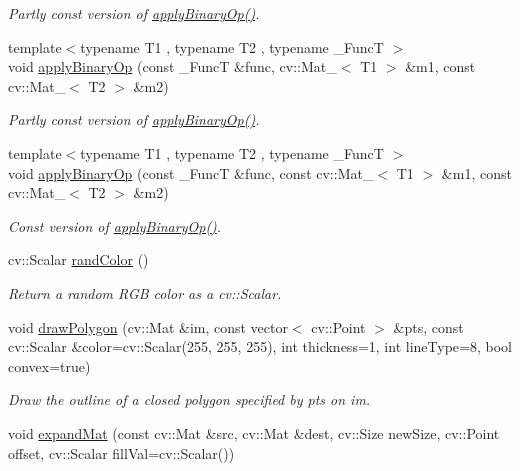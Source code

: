 \begin{DoxyCompactItemize}
\begin{DoxyCompactList}\small\item\em Partly const version of \hyperlink{namespacecvutils_a9a51cd204369adbf1321482a67c101dc}{apply\-Binary\-Op()}. \end{DoxyCompactList}\item 
{\footnotesize template$<$typename T1 , typename T2 , typename \-\_\-\-Func\-T $>$ }\\void \hyperlink{namespacecvutils_a18bf9198d170d4f95ebeda01c4c66b48}{apply\-Binary\-Op} (const \-\_\-\-Func\-T \&func, cv\-::\-Mat\-\_\-$<$ T1 $>$ \&m1, const cv\-::\-Mat\-\_\-$<$ T2 $>$ \&m2)
\begin{DoxyCompactList}\small\item\em Partly const version of \hyperlink{namespacecvutils_a9a51cd204369adbf1321482a67c101dc}{apply\-Binary\-Op()}. \end{DoxyCompactList}\item 
{\footnotesize template$<$typename T1 , typename T2 , typename \-\_\-\-Func\-T $>$ }\\void \hyperlink{namespacecvutils_a7de5d736aac8827c278399e59cdb62ce}{apply\-Binary\-Op} (const \-\_\-\-Func\-T \&func, const cv\-::\-Mat\-\_\-$<$ T1 $>$ \&m1, const cv\-::\-Mat\-\_\-$<$ T2 $>$ \&m2)
\begin{DoxyCompactList}\small\item\em Const version of \hyperlink{namespacecvutils_a9a51cd204369adbf1321482a67c101dc}{apply\-Binary\-Op()}. \end{DoxyCompactList}\item 
cv\-::\-Scalar \hyperlink{namespacecvutils_abcad4782a40d57854115ea2dcdab401b}{rand\-Color} ()
\begin{DoxyCompactList}\small\item\em Return a random R\-G\-B color as a cv\-::\-Scalar. \end{DoxyCompactList}\item 
void \hyperlink{namespacecvutils_a683e21d8e2c62e903c76ae0279e4a94d}{draw\-Polygon} (cv\-::\-Mat \&im, const vector$<$ cv\-::\-Point $>$ \&pts, const cv\-::\-Scalar \&color=cv\-::\-Scalar(255, 255, 255), int thickness=1, int line\-Type=8, bool convex=true)
\begin{DoxyCompactList}\small\item\em Draw the outline of a closed polygon specified by {\ttfamily pts} on {\ttfamily im}. \end{DoxyCompactList}\item 
void \hyperlink{namespacecvutils_ada4f02293fd7783beff2240b94d625a7}{expand\-Mat} (const cv\-::\-Mat \&src, cv\-::\-Mat \&dest, cv\-::\-Size new\-Size, cv\-::\-Point offset, cv\-::\-Scalar fill\-Val=cv\-::\-Scalar())

\end{DoxyCompactItemize}
